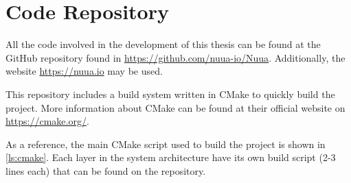 \section{Code Repository}

All the code involved in the development of this thesis can be found at the GitHub repository found in
\url{https://github.com/nuua-io/Nuua}. Additionally, the website \url{https://nuua.io} may be used.

This repository includes a build system written in CMake to quickly build the project. More information about CMake can be found
at their official website on \url{https://cmake.org/}.

As a reference, the main CMake script used to build the project is shown in \autoref{ls:cmake}.
Each layer in the system architecture have its own build script (2-3 lines each) that can be found on the repository.\\


